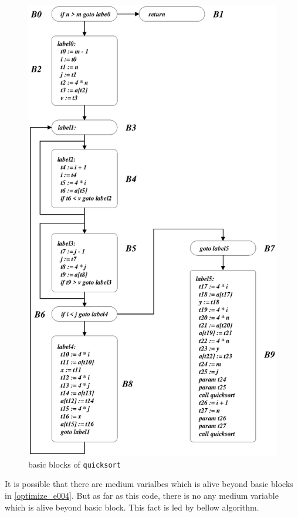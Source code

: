 \begin{figure}[htbp]
\begin{center}
\begin{latexonly}
\includegraphics[width=1.01\linewidth,height=1.75\linewidth]{quicksort.eps}
\end{latexonly}
\caption{basic blocks of {\tt{quicksort}}}
\label{optimize_e002}
\end{center}
\end{figure}
It is possible that there are medium varialbes which is alive beyond
basic blocks in \ref{optimize_e004}. But as far as this code, there is
no any medium variable which is alive beyond basic block.
This fact is led by bellow algorithm.

